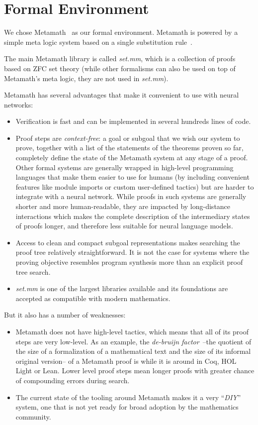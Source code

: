 \documentclass{article}
\begin{document}
\section{Formal Environment}

We chose Metamath~\cite{megill2019metamath} as our formal environment. Metamath is powered by a simple meta logic system based on a single substitution rule~\cite{megill2006how}.

The main Metamath library is called \textit{set.mm}, which is a collection of  proofs based on ZFC set theory (while other formalisms can also be used on top of Metamath's meta logic, they are not used in {\it set.mm}).

Metamath has several advantages that make it convenient to use with neural networks:
\begin{itemize}
  \item Verification is fast and can be implemented in several hundreds lines of code.
  \item Proof steps are \textit{context-free}: a goal or subgoal that we wish our system to prove, together with a list of the statements of the theorems proven so far, completely define the state of the Metamath system at any stage of a proof. Other formal systems are generally wrapped in high-level programming languages that make them easier to use for humans (by including convenient features like module imports or custom user-defined tactics) but are harder to integrate with a neural network. While proofs in such systems are generally shorter and more human-readable, they are impacted by long-distance interactions which makes the complete description of the intermediary states of proofs longer, and therefore less suitable for neural language models.
  \item Access to clean and compact subgoal representations makes searching the proof tree relatively straightforward. It is not the case for systems where the proving objective resembles program synthesis more than an explicit proof tree search.
  \item \textit{set.mm} is one of the largest libraries available and its foundations are accepted as compatible with modern mathematics.
\end{itemize}

But it also has a number of weaknesses:
\begin{itemize}
  \item Metamath does not have high-level tactics, which means that all of its proof steps are very low-level. As an example, the \textit{de-bruijn factor}~\cite{wiedijk2014debruijn}--the quotient of the size of a formalization of a mathematical text and the size of its informal original version-- of a Metamath proof is  while it is around  in Coq, HOL Light or Lean.  Lower level proof steps mean longer proofs with greater chance of compounding errors during search.
  \item The current state of the tooling around Metamath makes it a very ``\textit{DIY}'' system, one that is not yet ready for broad adoption by the mathematics community.
\end{itemize}
\end{document}
